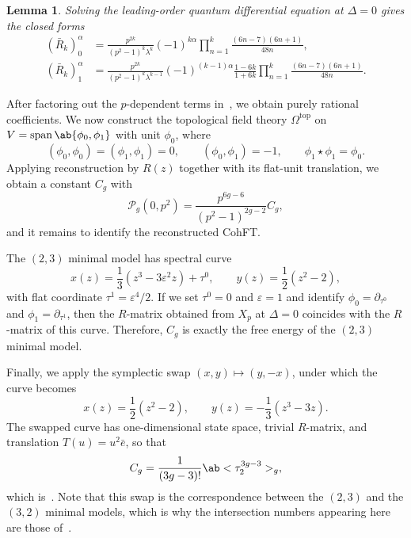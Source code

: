 \documentclass{amsart}
\newtheorem{lem}[thm]{Lemma}
\theoremstyle{definition}
\theoremstyle{remark}
\theoremstyle{plain}
\theoremstyle{definition}
\theoremstyle{remark}
\newcommand{\ep}{\varepsilon}
\newcommand{\mc}[1]{\mathcal{#1}}
\newcommand{\mr}[1]{\mathrm{#1}}
\newcommand{\on}[1]{\operatorname{#1}}
\newcommand{\1}{\mathbf{1}}
\newcommand{\2}{\mathbf{2}}
\newcommand{\3}{\mathbf{3}}
\begin{document}
\begin{lem}%
\label{lem:R matrix at Delta zero}
    Solving the leading-order quantum differential equation at \(\Delta = 0\) gives the closed forms
    \begin{align*}
        (\bar{R}_k)_0^{\alpha} &= \frac{p^{2k}}{(p^2-1)^k\lambda^k}(-1)^{k\alpha}\prod_{n=1}^k \frac{(6n-7)(6n+1)}{48n}, \\
        (\bar{R}_k)_1^{\alpha} &= \frac{p^{2k}}{(p^2-1)^k \lambda^{k-1}}(-1)^{(k-1)\alpha}\frac{1-6k}{1+6k}\prod_{n=1}^k \frac{(6n-7)(6n+1)}{48n}.
    \end{align*}
\end{lem}

After factoring out the \(p\)-dependent terms in~, we obtain purely rational coefficients. We now construct the topological field theory \(\Omega^{\mr{top}}\) on \(V = \on{span}\ab\{\phi_0,\phi_1\}\) with unit \(\phi_0\), where
\[ (\phi_0,\phi_0) = (\phi_1,\phi_1) = 0, \qquad (\phi_0,\phi_1) = -1, \qquad \phi_1 \star \phi_1 = \phi_0. \]
Applying reconstruction by \(R(z)\) together with its flat-unit translation, we obtain a constant \(C_g\) with
\[ \mc{P}_g(0,p^2) = \frac{p^{6g-6}}{(p^2-1)^{2g-2}}C_g, \]
and it remains to identify the reconstructed CohFT.

The \((2,3)\) minimal model has spectral curve
\[ x(z) = \frac{1}{3}(z^3-3\ep^2 z) + \tau^0, \qquad y(z) = \frac{1}{2}(z^2-2), \]
with flat coordinate \(\tau^1 = \ep^4/2\). If we set \(\tau^0 = 0\) and \(\ep = 1\) and identify \(\phi_0 = \partial_{\tau^0}\) and \(\phi_1 = \partial_{\tau^1}\), then the \(R\)-matrix obtained from \(X_p\) at \(\Delta = 0\) coincides with the \(R\)-matrix of this curve. Therefore, \(C_g\) is exactly the free energy of the \((2,3)\) minimal model.

Finally, we apply the symplectic swap \((x,y) \mapsto (y,-x)\), under which the curve becomes
\[ x(z) = \frac{1}{2}(z^2-2), \qquad y(z) = -\frac{1}{3}(z^3-3z). \]
The swapped curve has one-dimensional state space, trivial \(R\)-matrix, and translation \(T(u) = u^2 \bar{e}\), so that
\[ C_g = \frac{1}{(3g-3)!}\ab<\tau_2^{3g-3}>_g, \]
which is~. Note that this swap is the correspondence between the \((2,3)\) and the \((3,2)\) minimal models, which is why the intersection numbers appearing here are those of~.
\end{document}
